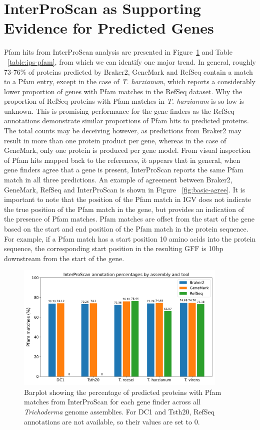 \section{InterProScan as Supporting Evidence for Predicted Genes}
\label{section:interproscan}

Pfam hits from InterProScan analysis are presented in Figure~\ref{fig:ips-counts} and Table
~\ref{table:ips-pfam}, from which we can identify one major trend. In
general, roughly 73-76\% of proteins predicted by Braker2, GeneMark
and RefSeq contain a match to a Pfam entry, except in the case of
\textit{T. harzianum}, which reports a considerably lower proportion
of genes with Pfam matches in the RefSeq dataset. Why the proportion
of RefSeq proteins with Pfam matches in \textit{T. harzianum} is so
low is unknown. This is promising performance for the gene finders as
the RefSeq annotations demonstrate similar proportions of Pfam hits to
predicted proteins. The total counts may be deceiving however, as
predictions from Braker2 may result in more than one protein product
per gene, whereas in the case of GeneMark, only one protein is
produced per gene model. From visual inspection of Pfam hits mapped
back to the references, it appears that in general, when gene finders
agree that a gene is present, InterProScan reports the same Pfam match
in all three predictions. An example of agreement between Braker2,
GeneMark, RefSeq and InterProScan is shown in Figure
~\ref{fig:basic-agree}. It is important to note that the position of
the Pfam match in IGV does not indicate the true position of the Pfam
match in the gene, but provides an indication of the presence of Pfam
matches. Pfam matches are offset from the start of the gene based on
the start and end position of the Pfam match in the protein
sequence. For example, if a Pfam match has a start position 10 amino
acids into the protein sequence, the corresponding start position in
the resulting GFF is 10bp downstream from the start of the gene.

\begin{figure}
  \centering
  \includegraphics[width=0.90\textwidth]{figures/interproscan-barplot.pdf}
  \caption[Percentage of proteins with Pfam matches]{Barplot showing the percentage of predicted proteins with Pfam matches from InterProScan for each gene finder across all \textit{Trichoderma} genome assemblies. For DC1 and Tsth20, RefSeq annotations are not available, so their values are set to 0.}
  \label{fig:ips-counts}
\end{figure}

